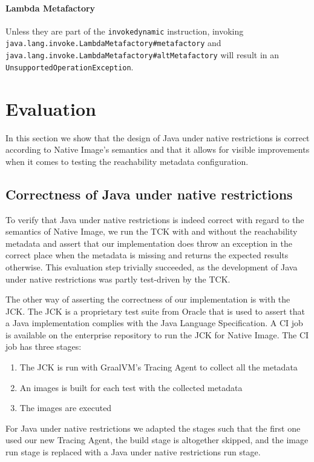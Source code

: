 \subsubsection{Lambda Metafactory}
Unless they are part of the \texttt{invokedynamic} instruction, invoking \texttt{java.lang.invoke.LambdaMetafactory\#metafactory} and \texttt{java.lang.invoke.LambdaMetafactory\#altMetafactory} will result in an \texttt{UnsupportedOperationException}.


\chapter{Evaluation}
In this section we show that the design of Java under native restrictions is correct according to Native Image's semantics and that it allows for visible improvements when it comes to testing the reachability metadata configuration.

\section{Correctness of Java under native restrictions}
To verify that Java under native restrictions is indeed correct with regard to the semantics of Native Image, we run the TCK with and without the reachability metadata and assert that our implementation does throw an exception in the correct place when the metadata is missing and returns the expected results otherwise. This evaluation step trivially succeeded, as the development of Java under native restrictions was partly test-driven by the TCK.

The other way of asserting the correctness of our implementation is with the JCK. The JCK is a proprietary test suite from Oracle that is used to assert that a Java implementation complies with the Java Language Specification. A CI job is available on the enterprise repository to run the JCK for Native Image. The CI job has three stages:
\begin{enumerate}
    \item The JCK is run with GraalVM's Tracing Agent to collect all the metadata
    \item An images is built for each test with the collected metadata
    \item The images are executed
\end{enumerate}
For Java under native restrictions we adapted the stages such that the first one used our new Tracing Agent, the build stage is altogether skipped, and the image run stage is replaced with a Java under native restrictions run stage.

